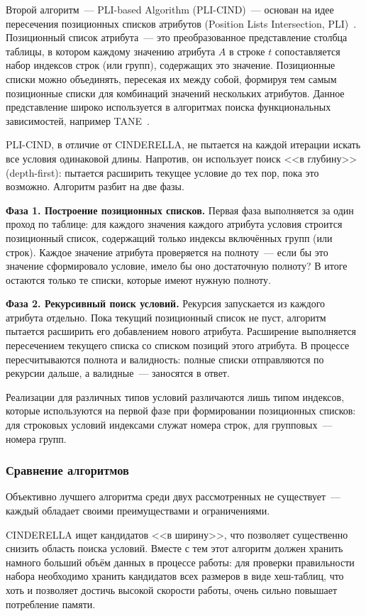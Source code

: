 Второй алгоритм~--- PLI-based Algorithm (PLI-CIND)~--- основан на идее пересечения позиционных списков атрибутов (Position Lists Intersection, PLI)~\cite{brink2012cind}. Позиционный список атрибута~--- это преобразованное представление столбца таблицы, в котором каждому значению атрибута $A$ в строке $t$ сопоставляется набор индексов строк (или групп), содержащих это значение. Позиционные списки можно объединять, пересекая их между собой, формируя тем самым позиционные списки для комбинаций значений нескольких атрибутов. Данное представление широко используется в алгоритмах поиска функциональных зависимостей, например TANE~\cite{huhtala1999tane}.

PLI-CIND, в отличие от CINDERELLA, не пытается на каждой итерации искать все условия одинаковой длины. Напротив, он использует поиск <<в глубину>> (depth-first): пытается расширить текущее условие до тех пор, пока это возможно. Алгоритм разбит на две фазы.

\textbf{Фаза 1. Построение позиционных списков.} Первая фаза выполняется за один проход по таблице: для каждого значения каждого атрибута условия строится позиционный список, содержащий только индексы включённых групп (или строк). Каждое значение атрибута проверяется на полноту~--- если бы это значение сформировало условие, имело бы оно достаточную полноту? В итоге остаются только те списки, которые имеют нужную полноту.

\textbf{Фаза 2. Рекурсивный поиск условий.} Рекурсия запускается из каждого атрибута отдельно. Пока текущий позиционный список не пуст, алгоритм пытается расширить его добавлением нового атрибута. Расширение выполняется пересечением текущего списка со списком позиций этого атрибута. В процессе пересчитываются полнота и валидность: полные списки отправляются по рекурсии дальше, а валидные~--- заносятся в ответ.

Реализации для различных типов условий различаются лишь типом индексов, которые используются на первой фазе при формировании позиционных списков: для строковых условий индексами служат номера строк, для групповых~--- номера групп.

\subsubsection{Сравнение алгоритмов}

Объективно лучшего алгоритма среди двух рассмотренных не существует~--- каждый обладает своими преимуществами и ограничениями.

CINDERELLA ищет кандидатов <<в ширину>>, что позволяет существенно снизить область поиска условий. Вместе с тем этот алгоритм должен хранить намного больший объём данных в процессе работы: для проверки правильности набора необходимо хранить кандидатов всех размеров в виде хеш-таблиц, что хоть и позволяет достичь высокой скорости работы, очень сильно повышает потребление памяти.


